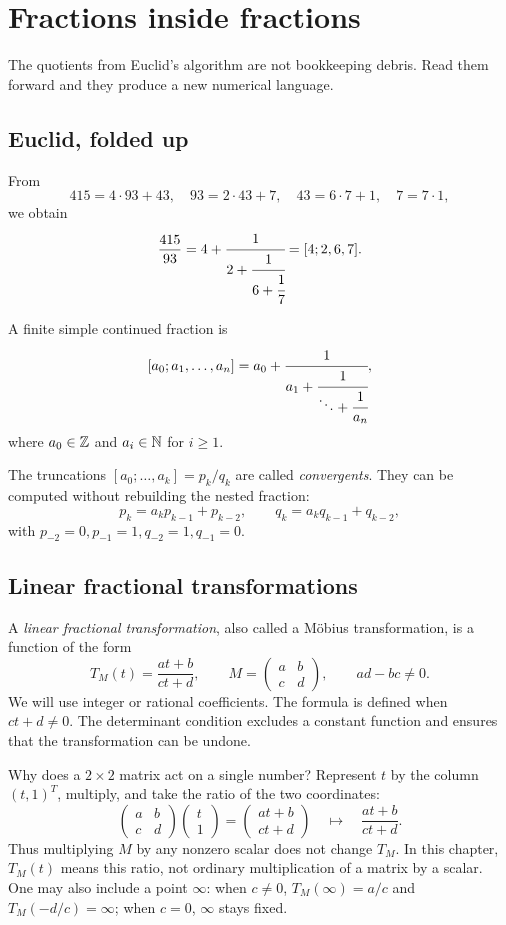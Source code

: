 \chapter{Fractions inside fractions}

The quotients from Euclid's algorithm are not bookkeeping debris. Read them forward and they produce a new numerical language.

\section{Euclid, folded up}

From
\[
415=4\cdot93+43,\quad 93=2\cdot43+7,\quad
43=6\cdot7+1,\quad 7=7\cdot1,
\]
we obtain
\[
\frac{415}{93}=4+\cfrac1{2+\cfrac1{6+\cfrac1{7}}}=[4;2,6,7].
\]

\begin{definition}
A finite simple continued fraction is
\[
[a_0;a_1,\dots,a_n]
=a_0+\cfrac1{a_1+\cfrac1{\ddots+\cfrac1{a_n}}},
\]
where $a_0\in\mathbb Z$ and $a_i\in\mathbb N$ for $i\ge1$.
\end{definition}

The truncations $[a_0;\dots,a_k]=p_k/q_k$ are called \emph{convergents}. They can be computed without rebuilding the nested fraction:
\[
p_k=a_kp_{k-1}+p_{k-2},\qquad q_k=a_kq_{k-1}+q_{k-2},
\]
with $p_{-2}=0,p_{-1}=1,q_{-2}=1,q_{-1}=0$.

\section{Linear fractional transformations}
\label{sec:mobius}

A \emph{linear fractional transformation}, also called a M\"obius
transformation, is a function of the form
\[
 T_M(t)=\frac{at+b}{ct+d},
 \qquad M=\begin{pmatrix}a&b\\c&d\end{pmatrix},
 \qquad ad-bc\ne0.
\]
We will use integer or rational coefficients. The formula is defined when
$ct+d\ne0$. The determinant condition excludes a constant function and
ensures that the transformation can be undone.

Why does a $2\times2$ matrix act on a single number? Represent $t$ by the
column $(t,1)^T$, multiply, and take the ratio of the two coordinates:
\[
 \begin{pmatrix}a&b\\c&d\end{pmatrix}
 \begin{pmatrix}t\\1\end{pmatrix}
 =\begin{pmatrix}at+b\\ct+d\end{pmatrix}
 \quad\longmapsto\quad \frac{at+b}{ct+d}.
\]
Thus multiplying $M$ by any nonzero scalar does not change $T_M$. In this
chapter, $T_M(t)$ means this ratio, not ordinary multiplication of a matrix
by a scalar. One may also include a point $\infty$: when $c\ne0$,
$T_M(\infty)=a/c$ and $T_M(-d/c)=\infty$; when $c=0$, $\infty$ stays fixed.

